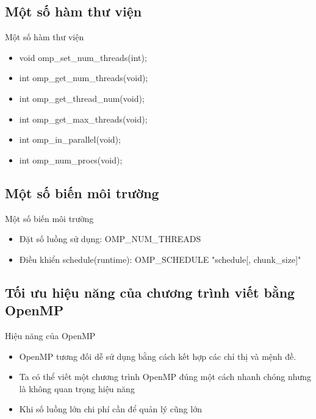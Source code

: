 \documentclass[10pt]{beamer}
\theoremstyle{remark}
\numberwithin{algocf}{section}
\numberwithin{equation}{section}
\numberwithin{dl}{section}
\numberwithin{figure}{section}
\begin{document}
\subsection{Một số hàm thư viện}

\begin{frame}{Một số hàm thư viện}
    \begin{itemize}
        \item void omp\_set\_num\_threads(int);
        \item int omp\_get\_num\_threads(void);
        \item int omp\_get\_thread\_num(void);
        \item int omp\_get\_max\_threads(void);
        \item int omp\_in\_parallel(void);
        \item int omp\_num\_procs(void);	

    \end{itemize}
\end{frame}

\subsection{Một số biến môi trường}
\begin{frame}{Một số biến môi trường}
    \begin{itemize}
        \item Đặt số luồng sử dụng: OMP\_NUM\_THREADS
        \item Điều khiển schedule(runtime): OMP\_SCHEDULE "schedule[, chunk\_size]"
    \end{itemize}
\end{frame}

\subsection{Tối ưu hiệu năng của chương trình viết bằng OpenMP}

\begin{frame}{Hiệu năng của OpenMP}
    \begin{itemize}
        \item OpenMP tương đối dễ sử dụng bằng cách kết hợp các chỉ thị và mệnh đề.
        \item Ta có thể viết một chương trình OpenMP đúng một cách nhanh chóng nhưng là không quan trọng hiệu năng
        \item Khi số luồng lớn chi phí cần để quản lý cũng lớn
    \end{itemize}
\end{frame}
\end{document}
